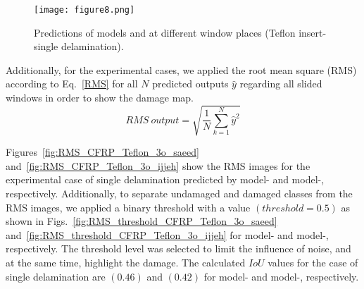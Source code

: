 \begin{figure}[!h]
	\centering
	\texttt{[image: figure8.png]}
	\caption{Predictions of models  and  at different window places (Teflon insert-single delamination).}
	\label{fig:CFRP_Teflon_3o_predictions}
\end{figure}

Additionally, for the experimental cases, we applied the root mean square (RMS) according to Eq.~\ref{RMS} for all \(N\) predicted outputs \(\hat{y}\) regarding all slided windows in order to show the damage map.
\begin{equation}
	RMS\ output = \sqrt{\frac{1}{N}\sum_{k=1}^{N}\hat{y}^2}	
	\label{RMS}
\end{equation}

Figures~\ref{fig:RMS_CFRP_Teflon_3o_saeed} and~\ref{fig:RMS_CFRP_Teflon_3o_ijjeh} show the RMS images for the experimental case of single delamination predicted by model- and model-, respectively.
Additionally, to separate undamaged and damaged classes from the RMS images, we applied a binary threshold with a value \((threshold=0.5)\) as shown in Figs.~\ref{fig:RMS_threshold_CFRP_Teflon_3o_saeed} and~\ref{fig:RMS_threshold_CFRP_Teflon_3o_ijjeh} for model- and model-, respectively. 
The threshold level was selected to limit the influence of noise, and at the same time, highlight the damage.
The calculated \(IoU\) values for the case of single delamination are \((0.46)\) and \((0.42)\) for model- and model-, respectively.

